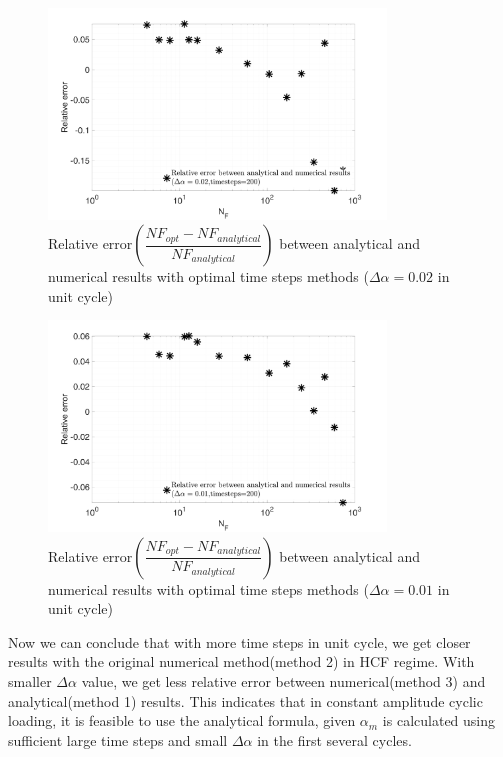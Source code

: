 \documentclass[3p,times,number,review]{elsarticle}
\begin{document}
\begin{figure}[!h]
	\centering
	\includegraphics[width=0.8\textwidth]{figures//SN_opt_ana_200_delta_alp=0.02_err.png} 
	\caption{Relative error$\left( \dfrac{NF_{opt}-NF_{analytical}}{NF_{analytical}}\right)$  between analytical and numerical results with optimal time steps methods ($\Delta \alpha=0.02$ in unit cycle)}	
	\label{fig.errorNumAna0.02}
\end{figure}
\begin{figure}[!h]
	\centering
	\includegraphics[width=0.8\textwidth]{figures//SN_opt_ana_200_delta_alp=0.01_err.png} 
	\caption{Relative error$\left(\dfrac{NF_{opt}-NF_{analytical}}{NF_{analytical}}\right)$  between analytical and numerical results with optimal time steps methods ($\Delta \alpha=0.01$ in unit cycle)}
	\label{fig.errorNumAna0.01}
\end{figure}

Now we can conclude that with more time steps in unit cycle, we get closer results with the original numerical method(method 2) in HCF regime. With smaller $\Delta \alpha$ value, we get less relative error between numerical(method 3) and analytical(method 1) results. This indicates that in constant amplitude cyclic loading, it is feasible to use the analytical formula, given $\alpha_m$ is calculated using sufficient large time steps and small $\Delta \alpha$ in the first several cycles.
\end{document}
